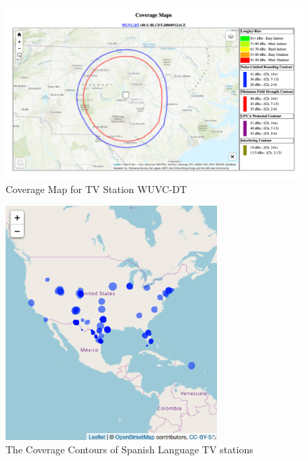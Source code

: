 \documentclass[11pt]{article}
\begin{document}
%

\begin{figure}[!hbtp]
\centering
\caption{Coverage Map for TV Station WUVC-DT}\label{contourexamplefig}
\includegraphics[width=15cm]{../../analysis/Output/img/ContourExample.png}
\end{figure} 

\begin{figure}[!hbtp]
\centering
\caption{The Coverage Contours of Spanish Language TV stations}\label{contourfig}
\includegraphics[width=8cm]{../../analysis/Output/img/SpanishContours.png}
\end{figure} 
\end{document}
